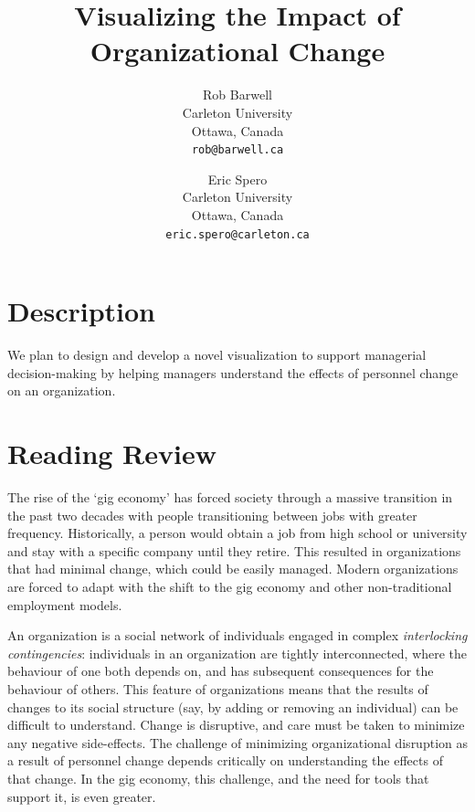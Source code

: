 \documentclass[12pt,letterpaper]{article}
\title{Visualizing the Impact of Organizational Change}
\author{
  Rob Barwell\\ %
  \small \vspace{-.15cm}Carleton University\\
  \small Ottawa, Canada\\
  \small \texttt{rob@barwell.ca}
       \and
Eric Spero\\ %
       \small \vspace{-.15cm}Carleton University\\
       \small Ottawa, Canada\\
       \small \texttt{eric.spero@carleton.ca}
}
\begin{document}

\maketitle

\section{Description}

We plan to design and develop a novel visualization to support managerial decision-making by helping managers understand the effects of personnel change on an organization.

\section{Reading Review}

The rise of the \lq gig economy\rq{}\cite{de2015rise,friedman2014workers} has forced society through a massive transition in the past two decades with people transitioning between jobs with greater frequency.  Historically, a person would obtain a job from high school or university and stay with a specific company until they retire.  This resulted in organizations that had minimal change, which could be easily managed. Modern organizations are forced to adapt with the shift to the gig economy and other non-traditional employment models.  

An organization is a social network\cite{scott1988social} of individuals engaged in complex \emph{interlocking contingencies}\cite{glenn2006complexity}: individuals in an organization are tightly interconnected, where the behaviour of one both depends on, and has subsequent consequences for the behaviour of others\cite{glenn2006complexity}. This feature of organizations means that the results of changes to its social structure (say, by adding or removing an individual) can be difficult to understand. Change is disruptive, and care must be taken to minimize any negative side-effects. The challenge of minimizing organizational disruption as a result of personnel change depends critically on understanding the effects of that change. In the gig economy, this challenge, and the need for tools that support it, is even greater. 
\end{document}
